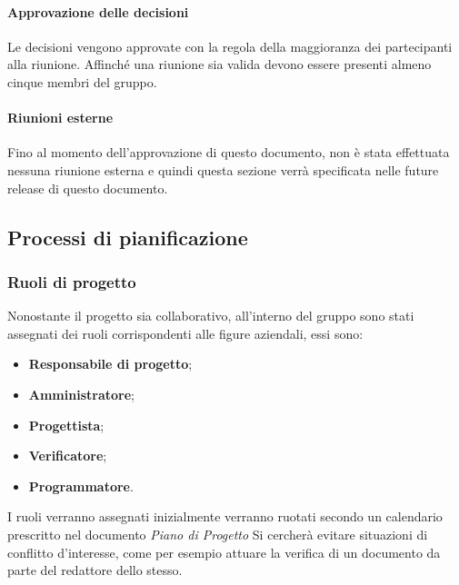                        \paragraph{Approvazione delle decisioni}
                            Le decisioni vengono approvate con la regola della maggioranza dei partecipanti alla riunione.
                            Affinché una riunione sia valida devono essere presenti almeno cinque membri del gruppo.
                            
                      \paragraph{Riunioni esterne}
                      Fino al momento dell'approvazione di questo documento, non è stata effettuata nessuna riunione esterna e quindi questa sezione verrà specificata nelle future release di questo documento.
        \subsection{Processi di pianificazione}
            \subsubsection{Ruoli di progetto}
                Nonostante il progetto sia collaborativo, all'interno del gruppo sono stati assegnati dei ruoli corrispondenti alle figure aziendali, essi sono:
                \begin{itemize}
                    \item \textbf{Responsabile di progetto};
                    \item \textbf{Amministratore};
                    \item \textbf{Progettista};
                    \item \textbf{Verificatore};
                    \item \textbf{Programmatore}.
                \end{itemize}
                I ruoli verranno assegnati inizialmente verranno ruotati secondo un calendario prescritto nel documento \textit{Piano di Progetto}
                Si cercherà evitare situazioni di conflitto d'interesse, come per esempio attuare la verifica di un documento da parte del redattore dello stesso.

